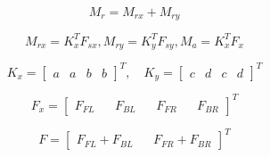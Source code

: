 \begin{equation}
M_r=M_{rx}+M_{ry}
\end{equation}

\begin{equation}
M_{rx}=K^T_xF_{sx},M_{ry}=K^T_yF_{sy}, M_a = K^T_xF_x
\end{equation}

\begin{equation*}
K_x =\begin{bmatrix}
a & a & b & b
\end{bmatrix}^T
,\quad
K_y =\begin{bmatrix}
c & d & c & d
\end{bmatrix}^T
\end{equation*}

\begin{equation*}
F_x= \begin{bmatrix}
F_{FL}&& 
F_{BL}&& 
F_{FR}&& 
F_{BR}
\end{bmatrix}^T
\end{equation*}

\begin{equation*}
    F = \begin{bmatrix}
    F_{FL}+F_{BL} &&
    F_{FR}+F_{BR}
    \end{bmatrix}^T
\end{equation*}

